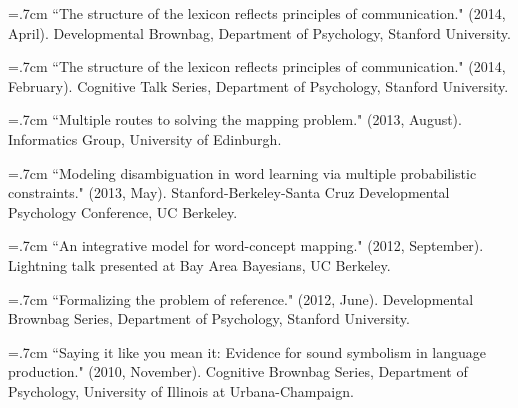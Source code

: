 \documentclass[letterpaper]{article}
\begin{document}
\hangindent=.7cm ``The structure of the lexicon reflects principles of communication." (2014, April). Developmental Brownbag, Department of Psychology, Stanford University.

\hangindent=.7cm ``The structure of the lexicon reflects principles of communication." (2014, February). Cognitive Talk Series, Department of Psychology, Stanford University.

\hangindent=.7cm ``Multiple routes to solving the mapping problem." (2013, August). Informatics Group, University of Edinburgh.

\hangindent=.7cm ``Modeling disambiguation in word learning via multiple probabilistic constraints." (2013, May). Stanford-Berkeley-Santa Cruz Developmental Psychology Conference, UC Berkeley.

 \hangindent=.7cm ``An integrative model for word-concept mapping." (2012, September). Lightning talk presented at Bay Area Bayesians, UC Berkeley.

\hangindent=.7cm ``Formalizing the problem of reference."  (2012, June). Developmental Brownbag Series, Department of Psychology, Stanford University.

\hangindent=.7cm ``Saying it like you mean it: Evidence for sound symbolism in language production." (2010, November). Cognitive Brownbag Series, Department of Psychology, University of Illinois at Urbana-Champaign.

 \singlespacing


\end{document}
